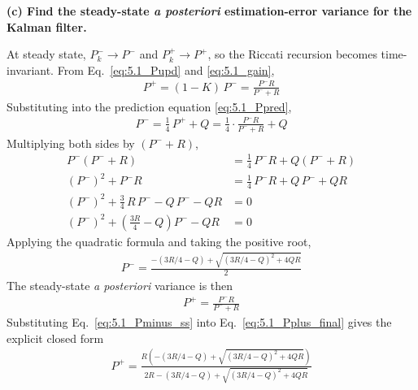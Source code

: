 \documentclass[12pt]{article}
\begin{document}
\begin{stepbox}
\textbf{(c) Find the steady-state \textit{a posteriori} estimation-error variance for the Kalman filter.}

\vspace{0.3cm}

At steady state, $P_k^- \to P^-$ and $P_k^+ \to P^+$, so the Riccati recursion becomes time-invariant. From Eq.~\eqref{eq:5.1_Pupd} and \eqref{eq:5.1_gain},
\begin{align}
P^+ = (1 - K)\,P^- = \frac{P^- R}{P^- + R} \label{eq:5.1_Pplus_ss}
\end{align}
Substituting into the prediction equation \eqref{eq:5.1_Ppred},
\begin{align}
P^- = \tfrac{1}{4}\,P^+ + Q = \tfrac{1}{4}\cdot\frac{P^- R}{P^- + R} + Q
\end{align}
Multiplying both sides by $(P^- + R)$,
\begin{align}
P^-(P^- + R) &= \tfrac{1}{4}\,P^- R + Q(P^- + R) \\
(P^-)^2 + P^- R &= \tfrac{1}{4}\,P^- R + Q\,P^- + QR \\
(P^-)^2 + \tfrac{3}{4}\,R\,P^- - Q\,P^- - QR &= 0 \\
(P^-)^2 + \left(\tfrac{3R}{4} - Q\right)P^- - QR &= 0 \label{eq:5.1_quadratic}
\end{align}
Applying the quadratic formula and taking the positive root,
\begin{align}
\boxed{P^- = \frac{-(3R/4 - Q) + \sqrt{(3R/4 - Q)^2 + 4QR}}{2}} \label{eq:5.1_Pminus_ss}
\end{align}
The steady-state \textit{a posteriori} variance is then
\begin{align}
\boxed{P^+ = \frac{P^- R}{P^- + R}} \label{eq:5.1_Pplus_final}
\end{align}
Substituting Eq.~\eqref{eq:5.1_Pminus_ss} into Eq.~\eqref{eq:5.1_Pplus_final} gives the explicit closed form
\begin{align}
\boxed{
P^+ =
\frac{
R\left(-(3R/4 - Q) + \sqrt{(3R/4 - Q)^2 + 4QR}\right)
}{
2R -(3R/4 - Q) + \sqrt{(3R/4 - Q)^2 + 4QR}
}
}
\end{align}

\end{stepbox}
\end{document}
